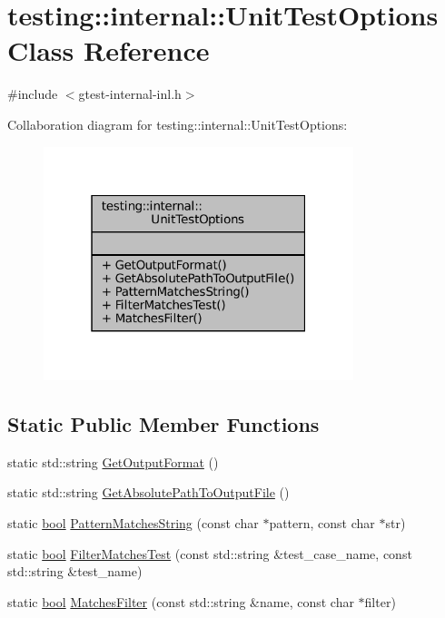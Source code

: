 \hypertarget{classtesting_1_1internal_1_1UnitTestOptions}{}\section{testing\+:\+:internal\+:\+:Unit\+Test\+Options Class Reference}
\label{classtesting_1_1internal_1_1UnitTestOptions}


{\ttfamily \#include $<$gtest-\/internal-\/inl.\+h$>$}



Collaboration diagram for testing\+:\+:internal\+:\+:Unit\+Test\+Options\+:
\nopagebreak
\begin{figure}[H]
\begin{center}
\leavevmode
\includegraphics[width=256pt]{classtesting_1_1internal_1_1UnitTestOptions__coll__graph}
\end{center}
\end{figure}
\subsection*{Static Public Member Functions}
\begin{DoxyCompactItemize}
\item 
static std\+::string \hyperlink{classtesting_1_1internal_1_1UnitTestOptions_ae7413a21296d885c6924650b51ac4f6d}{Get\+Output\+Format} ()
\item 
static std\+::string \hyperlink{classtesting_1_1internal_1_1UnitTestOptions_a993fb30ad66104158c8c0ac508daca3f}{Get\+Absolute\+Path\+To\+Output\+File} ()
\item 
static \hyperlink{classbool}{bool} \hyperlink{classtesting_1_1internal_1_1UnitTestOptions_af0235a2ee26dd6db21305e11d2358e4f}{Pattern\+Matches\+String} (const char $\ast$pattern, const char $\ast$str)
\item 
static \hyperlink{classbool}{bool} \hyperlink{classtesting_1_1internal_1_1UnitTestOptions_a9975b59cece94874b303421697e3bca6}{Filter\+Matches\+Test} (const std\+::string \&test\+\_\+case\+\_\+name, const std\+::string \&test\+\_\+name)
\item 
static \hyperlink{classbool}{bool} \hyperlink{classtesting_1_1internal_1_1UnitTestOptions_a67fc0adaffbb8d320b92e42e05017e4e}{Matches\+Filter} (const std\+::string \&name, const char $\ast$filter)
\end{DoxyCompactItemize}


